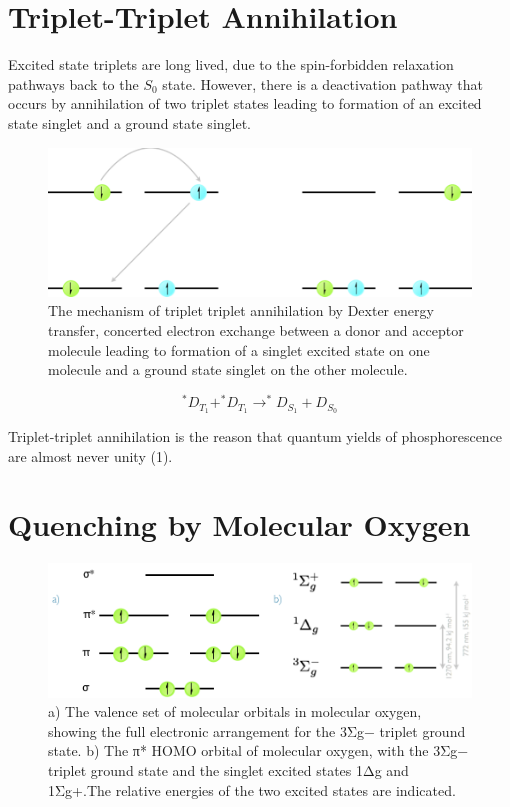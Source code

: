 \documentclass[
]{book}
\begin{document}
\hypertarget{sec:tripletannihilation}{%
\section{Triplet-Triplet Annihilation}\label{sec:tripletannihilation}}

Excited state triplets are long lived, due to the spin-forbidden relaxation pathways back to the \(S_0\) state. However, there is a deactivation pathway that occurs by annihilation of two triplet states leading to formation of an excited state singlet and a ground state singlet.

\begin{figure}

{\centering \includegraphics[width=0.7\linewidth]{images/triplettriplet} 

}

\caption{The mechanism of triplet triplet annihilation by Dexter energy transfer, concerted electron exchange between a donor and acceptor molecule leading to formation of a singlet excited state on one molecule and a ground state singlet on the other molecule.}\label{fig:triplettriplet}
\end{figure}

\begin{equation*}
^\ast D_{T_1}+^\ast D_{T_1} \longrightarrow ^\ast D_{S_1} + D_{S_0}
\end{equation*}

Triplet-triplet annihilation is the reason that quantum yields of phosphorescence are almost never unity (1).

\hypertarget{sec:O2quench}{%
\section{Quenching by Molecular Oxygen}\label{sec:O2quench}}

\begin{figure}

{\centering \includegraphics[width=0.7\linewidth]{images/O2} 

}

\caption{a) The valence set of molecular orbitals in molecular oxygen, showing the full electronic arrangement for the 3Σg− triplet ground state.  b) The π* HOMO orbital of molecular oxygen, with the 3Σg− triplet ground state and the singlet excited states 1Δg and 1Σg+.The relative energies of the two excited states are indicated.}\label{fig:O2}
\end{figure}
\end{document}
